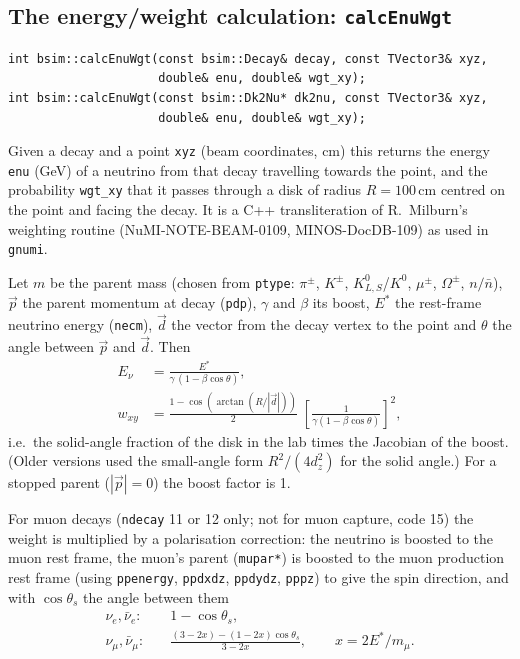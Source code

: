 \documentclass[11pt]{article}
\newcommand{\code}[1]{\texttt{#1}}
\begin{document}
\subsection{The energy/weight calculation: \code{calcEnuWgt}}\label{sec:calcenuwgt}

\begin{lstlisting}[style=cxx,numbers=none]
int bsim::calcEnuWgt(const bsim::Decay& decay, const TVector3& xyz,
                     double& enu, double& wgt_xy);
int bsim::calcEnuWgt(const bsim::Dk2Nu* dk2nu, const TVector3& xyz,
                     double& enu, double& wgt_xy);
\end{lstlisting}
Given a decay and a point \code{xyz} (beam coordinates, cm) this returns
the energy \code{enu} (GeV) of a neutrino from that decay travelling
towards the point, and the probability \code{wgt\_xy} that it passes
through a disk of radius $R = 100$\,cm centred on the point and facing the
decay.  It is a C++ transliteration of R.~Milburn's weighting routine
(NuMI-NOTE-BEAM-0109, MINOS-DocDB-109) as used in \code{gnumi}.

Let $m$ be the parent mass (chosen from \code{ptype}: $\pi^\pm$, $K^\pm$,
$K^0_{L,S}$/$K^0$, $\mu^\pm$, $\Omega^\pm$, $n/\bar n$), $\vec p$ the
parent momentum at decay (\code{pdp}), $\gamma$ and $\beta$ its boost,
$E^*$ the rest-frame neutrino energy (\code{necm}), $\vec d$ the vector
from the decay vertex to the point and $\theta$ the angle between $\vec p$
and $\vec d$.  Then
\begin{align}
  E_\nu &= \frac{E^*}{\gamma\,(1-\beta\cos\theta)}, \\
  w_{xy} &= \frac{1-\cos\left(\arctan(R/|\vec d|)\right)}{2}
           \;\left[\frac{1}{\gamma(1-\beta\cos\theta)}\right]^2 ,
\end{align}
i.e.\ the solid-angle fraction of the disk in the lab times the Jacobian of
the boost.  (Older versions used the small-angle form
$R^2/(4 d_z^2)$ for the solid angle.)  For a stopped parent
($|\vec p| = 0$) the boost factor is 1.

For muon decays (\code{ndecay} 11 or 12 only; not for muon capture, code
15) the weight is multiplied by a polarisation correction: the neutrino is
boosted to the muon rest frame, the muon's parent (\code{mupar*}) is
boosted to the muon production rest frame (using \code{ppenergy},
\code{ppdxdz}, \code{ppdydz}, \code{pppz}) to give the spin direction, and
with $\cos\theta_s$ the angle between them
\begin{align}
\nu_e,\bar\nu_e:&\quad 1-\cos\theta_s, \\
\nu_\mu,\bar\nu_\mu:&\quad
   \frac{(3-2x) - (1-2x)\cos\theta_s}{3-2x}, \qquad x = 2E^*/m_\mu .
\end{align}
\end{document}
